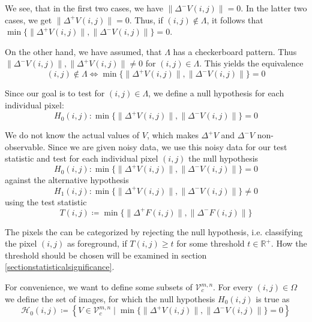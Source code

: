 \documentclass[a4paper,12pt]{article}
\newcommand{\norm}[1]{\lVert#1\rVert}
\theoremstyle{plain}
\theoremstyle{definition}
\begin{document}
We see, that in the first two cases, we have $\norm{\Delta^- V(i, j)} = 0$. In the latter two cases, we get $\norm{\Delta^+ V(i, j)} = 0$. Thus, if $(i, j) \notin \varLambda$, it follows that $\min \{ \norm{\Delta^+ V(i, j)}, \norm{\Delta^- V(i, j)} \} = 0$.

On the other hand, we have assumed, that $\varLambda$ has a checkerboard pattern. Thus $\norm{\Delta^- V(i, j)}, \norm{\Delta^+ V(i, j)} \neq 0$ for $(i, j) \in \varLambda$. This yields the equivalence
\begin{equation*}
	(i, j) \notin \varLambda \Leftrightarrow \min \{ \norm{\Delta^+ V(i, j)}, \norm{\Delta^- V(i, j)} \} = 0
\end{equation*}

Since our goal is to test for $(i, j) \in \varLambda$, we define a null hypothesis for each individual pixel:
\begin{equation*}
	H_0(i, j): \min \{ \norm{\Delta^+ V(i, j)}, \norm{\Delta^- V(i, j)} \} = 0
\end{equation*}

We do not know the actual values of $V$, which makes $\Delta^+ V$ and $\Delta^- V$ non-observable. Since we are given noisy data, we use this noisy data for our test statistic and test for each individual pixel $(i, j)$ the null hypothesis
\begin{equation}\label{nullhypothesis}
	H_0(i, j): \min \{ \norm{\Delta^+ V(i, j)}, \norm{\Delta^- V(i, j)} \} = 0
\end{equation}
against the alternative hypothesis
\begin{equation}\label{alternativehypothesis}
	H_1(i, j): \min \{ \norm{\Delta^+ V(i, j)}, \norm{\Delta^- V(i, j)} \} \neq 0
\end{equation}
using the test statistic
\begin{equation}\label{teststatistic}
	T(i, j) \coloneqq \min \{ \norm{\Delta^+ F(i, j)}, \norm{\Delta^- F(i, j)} \}
\end{equation}

The pixels the can be categorized by rejecting the null hypothesis, i.e. classifying the pixel $(i, j)$ as foreground, if $T(i, j) \geq t$ for some threshold $t \in \mathbb{R}^+$. How the threshold should be chosen will be examined in section \ref{sectionstatisticalsignificance}.

For convenience, we want to define some subsets of $\mathcal{V}_c^{m, n}$. For every $(i, j) \in \Omega$ we define the set of images, for which the null hypothesis $H_0(i, j)$ is true as
\begin{equation}
	\mathcal{H}_0(i, j) \coloneqq \left\{ V \in \mathcal{V}_c^{m, n} \mid \min \{ \norm{\Delta^+ V(i, j)}, \norm{\Delta^- V(i, j)} \} = 0 \right\}
\end{equation}
\end{document}
